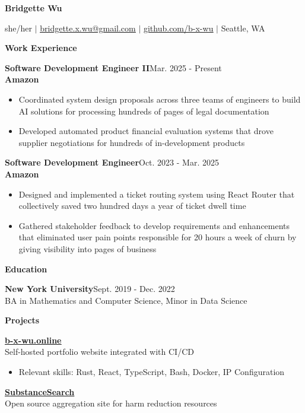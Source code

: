 \documentclass[11pt, oneside]{article}
\def\lralign #1#2{#1\hfill#2}
\def\experience #1#2#3{\vspace{6pt}\lralign{\textbf{\large#1}}{{#2}}\\#3}
\def\sectionheader #1{\vspace{15pt}\textbf{\Large #1}}
\def\link #1#2{\href{#1}{\ul{#2}}}
\begin{document}
\textbf{\LARGE Bridgette Wu}

she/her $\mid$ \link{mailto:bridgette.x.wu@gmail.com}{bridgette.x.wu@gmail.com} $\mid$ \link{https://github.com/b-x-wu}{github.com/b-x-wu} $\mid$ Seattle, WA

\sectionheader{Work Experience}

\experience{Software Development Engineer II}{Mar. 2025 - Present}{\textbf{Amazon}}
\begin{itemize}
\item Coordinated system design proposals across three teams of engineers to build AI solutions for
processing hundreds of pages of legal documentation

\item Developed automated product financial evaluation systems that drove supplier negotiations for
hundreds of in-development products
\end{itemize}

\experience{Software Development Engineer}{Oct. 2023 - Mar. 2025}{\textbf{Amazon}}

\begin{itemize}
\item Designed and implemented a ticket routing system using React Router that collectively saved
two hundred days a year of ticket dwell time

\item Gathered stakeholder feedback to develop requirements and enhancements that eliminated user
pain points responsible for 20 hours a week of churn by giving visibility into pages of business
\end{itemize}

\sectionheader{Education}

\experience{New York University}{Sept. 2019 - Dec. 2022}{BA in Mathematics and Computer Science, Minor in Data Science}

\sectionheader{Projects}

\experience{\link{https://b-x-wu.online/}{b-x-wu.online}}{}{Self-hosted portfolio website integrated with CI/CD}

\begin{itemize}
\item Relevant skills: Rust, React, TypeScript, Bash, Docker, IP Configuration
\end{itemize}

\experience{\link{https://github.com/SubstanceSearch/SubstanceSearch}{SubstanceSearch}}{}{Open source aggregation site for harm reduction resources}
\end{document}
